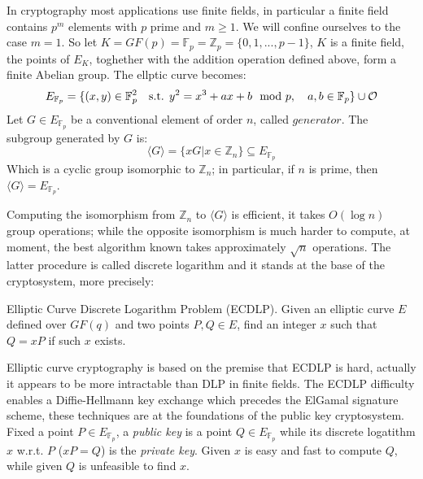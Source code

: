 In cryptography most applications use finite fields, in particular a finite field contains $p^m$ elements with $p$ prime and $m \geq 1$. We will confine ourselves to the case $m=1$. So let $K=GF(p)=\mathbb{F}_p =\mathbb{Z}_p  = \{0, 1, ..., p-1\}$, $K$ is a finite field, the points of $E_K$, toghether with the addition operation defined above, form a finite Abelian group. The ellptic curve becomes:
\begin{equation}
E_{\mathbb{F}_p}=\{(x,y)\in \mathbb{F}_p^2 \quad \textmd{s.t. }
y^2 = x^3 + ax + b \mod p, \quad a,b \in \mathbb{F}_p \} \cup \mathcal{O}
\end{equation}
Let $G \in E_{\mathbb{F}_p}$ be a conventional element of order $n$, called $generator$. The subgroup generated by $G$ is:
\begin{equation}
	\langle G \rangle = \{xG|x \in \mathbb{Z}_n\} \subseteq E_{\mathbb{F}_p}
\end{equation}
Which is a cyclic group isomorphic to $\mathbb{Z}_n$; in particular, if $n$ is prime, then $\langle G \rangle = E_{\mathbb{F}_p}$.

Computing the isomorphism from $\mathbb{Z}_n$ to $\langle G \rangle$ is efficient, it takes $O(\log n)$ group operations; while the opposite isomorphism is much harder to compute, at moment, the best algorithm known takes approximately $\sqrt{n}$ operations. The latter procedure is called discrete logarithm and it stands at the base of the cryptosystem, more precisely:
\begin{mydef}
	Elliptic Curve Discrete Logarithm Problem (ECDLP). Given an elliptic curve $E$ defined over $GF(q)$ and two points $P, Q \in E$, find an integer $x$ such that $Q = xP$ if such $x$ exists.
\end{mydef}
Elliptic curve cryptography is based on the premise that ECDLP is hard, actually it appears to be more intractable than DLP in finite fields.
The ECDLP difficulty enables a Diffie-Hellmann key exchange which precedes the ElGamal signature scheme, these techniques are at the foundations of the public key cryptosystem.
Fixed a point $P \in E_{\mathbb{F}_p}$, a \textit{public key} is a point $Q \in E_{\mathbb{F}_p}$ while its discrete logatithm $x$ w.r.t. $P$ ($xP=Q$) is the \textit{private key}.
Given $x$ is easy and fast to compute $Q$, while given $Q$ is unfeasible to find $x$.

